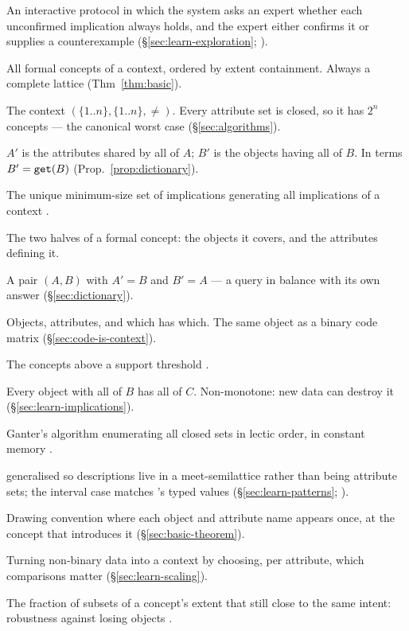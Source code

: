 \begin{description}[leftmargin=0pt,labelindent=0pt,style=nextline,
                    font=\normalfont\bfseries]
\item[Attribute exploration] An interactive protocol in which the system asks
  an expert whether each unconfirmed implication always holds, and the expert
  either confirms it or supplies a counterexample
  (\S\ref{sec:learn-exploration}; \citealp{ganter2016}).
\item[Concept lattice $\Bcl(\ctx)$] All formal concepts of a context, ordered
  by extent containment. Always a complete lattice (Thm~\ref{thm:basic}).
\item[Contranominal scale] The context $(\{1..n\},\{1..n\},\neq)$. Every
  attribute set is closed, so it has $2^n$ concepts --- the canonical
  worst case (\S\ref{sec:algorithms}).
\item[Derivation ($'$)] $A'$ is the attributes shared by all of $A$; $B'$ is
  the objects having all of $B$. In \odag{} terms $B' = \texttt{get}(B)$
  (Prop.~\ref{prop:dictionary}).
\item[Duquenne--Guigues base (stem base)] The unique minimum-size set of
  implications generating all implications of a context
  \citep{guigues1986}.
\item[Extent / intent] The two halves of a formal concept: the objects it
  covers, and the attributes defining it.
\item[Formal concept] A pair $(A,B)$ with $A'=B$ and $B'=A$ --- a query in
  balance with its own answer (\S\ref{sec:dictionary}).
\item[Formal context $(G,M,I)$] Objects, attributes, and which has which. The
  same object as a binary code matrix (\S\ref{sec:code-is-context}).
\item[Iceberg lattice] The concepts above a support threshold
  \citep{stumme2002}.
\item[Implication $B \to C$] Every object with all of $B$ has all of $C$.
  Non-monotone: new data can destroy it (\S\ref{sec:learn-implications}).
\item[NextClosure] Ganter's algorithm enumerating all closed sets in lectic
  order, in constant memory \citep{ganter1984}.
\item[Pattern structure] \fca{} generalised so descriptions live in a
  meet-semilattice rather than being attribute sets; the interval case
  matches \odag{}'s typed values (\S\ref{sec:learn-patterns};
  \citealp{ganter2001,kaytoue2011}).
\item[Reduced labelling] Drawing convention where each object and attribute
  name appears once, at the concept that introduces it
  (\S\ref{sec:basic-theorem}).
\item[Scaling] Turning non-binary data into a context by choosing, per
  attribute, which comparisons matter (\S\ref{sec:learn-scaling}).
\item[Stability] The fraction of subsets of a concept's extent that still
  close to the same intent: robustness against losing objects
  \citep{kuznetsov2007}.
\end{description}

